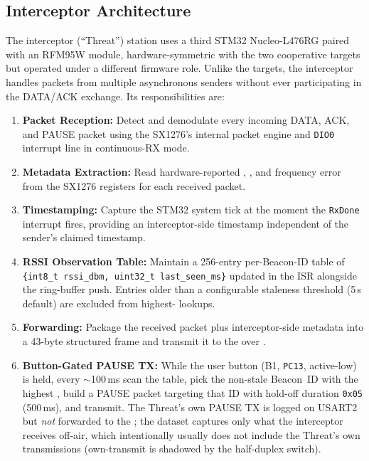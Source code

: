 \documentclass[11pt,letterpaper]{article}
\begin{document}
	\subsection{Interceptor Architecture}

	The interceptor (``Threat'') station uses a third STM32 Nucleo-L476RG paired with an RFM95W module, hardware-symmetric with the two cooperative targets but operated under a different firmware role. Unlike the targets, the interceptor handles packets from multiple asynchronous senders without ever participating in the DATA/ACK exchange. Its responsibilities are:

	\begin{enumerate}[leftmargin=2em]
		\item \textbf{Packet Reception:} Detect and demodulate every incoming DATA, ACK, and PAUSE packet using the SX1276's internal packet engine and \texttt{DIO0} interrupt line in continuous-RX mode.
		\item \textbf{Metadata Extraction:} Read hardware-reported \RSSI{}, \SNR{}, and frequency error from the SX1276 registers for each received packet.
		\item \textbf{Timestamping:} Capture the STM32 system tick at the moment the \texttt{RxDone} interrupt fires, providing an interceptor-side timestamp independent of the sender's claimed timestamp.
		\item \textbf{RSSI Observation Table:} Maintain a 256-entry per-Beacon-ID table of \texttt{\{int8\_t rssi\_dbm, uint32\_t last\_seen\_ms\}} updated in the ISR alongside the ring-buffer push. Entries older than a configurable staleness threshold (5\,s default) are excluded from highest-\RSSI{} lookups.
		\item \textbf{Forwarding:} Package the received packet plus interceptor-side metadata into a 43-byte structured frame and transmit it to the \FPGA{} over \UART{}.
		\item \textbf{Button-Gated PAUSE TX:} While the user button (B1, \texttt{PC13}, active-low) is held, every $\sim$100\,ms scan the \RSSI{} table, pick the non-stale Beacon~ID with the highest \RSSI{}, build a PAUSE packet targeting that ID with hold-off duration \texttt{0x05} (500\,ms), and transmit. The Threat's own PAUSE TX is logged on USART2 but \emph{not} forwarded to the \FPGA{}; the dataset captures only what the interceptor receives off-air, which intentionally usually does not include the Threat's own transmissions (own-transmit is shadowed by the half-duplex switch).
	\end{enumerate}
\end{document}

